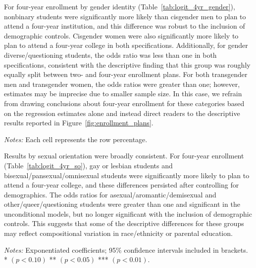 For four-year enrollment by gender identity (Table~\ref{tab:logit_4yr_gender}), nonbinary
students were significantly more likely than cisgender men to plan to
attend a four-year institution, and this difference was robust to the
inclusion of demographic controls. Cisgender women were also
significantly more likely to plan to attend a four-year college in both
specifications. Additionally, for gender diverse/questioning students,
the odds ratio was less than one in both specifications, consistent with
the descriptive finding that this group was roughly equally split
between two- and four-year enrollment plans. For both transgender men
and transgender women, the odds ratios were greater than one; however,
estimates may be imprecise due to smaller sample size. In this case, we
refrain from drawing conclusions about four-year enrollment for these
categories based on the regression estimates alone and instead direct
readers to the descriptive results reported in Figure~\ref{fig:enrollment_plans}.

\begin{table}
\centering
\caption{Intended Field of Study by Gender Identity}
\label{tab:field_of_study}
\footnotesize
\setlength{\tabcolsep}{3pt}

\medskip
\begin{minipage}{\linewidth}
\noindent\footnotesize\textit{Notes:} Each cell represents the row percentage.
\end{minipage}

\end{table}


Results by sexual orientation were broadly consistent. For four-year
enrollment (Table~\ref{tab:logit_4yr_so}), gay or lesbian students and
bisexual/pansexual/omnisexual students were significantly more likely to
plan to attend a four-year college, and these differences persisted
after controlling for demographics. The odds ratios for
asexual/aromantic/demisexual and other/queer/questioning students were
greater than one and significant in the unconditional models, but no
longer significant with the inclusion of demographic controls. This
suggests that some of the descriptive differences for these groups may
reflect compositional variation in race/ethnicity or parental education.

\begin{table}[htbp]
\centering
\caption{Logit Models: Intent to Attend 4-Year College by Gender Identity (Odds Ratios)}
\label{tab:logit_4yr_gender}

\medskip
\begin{minipage}{\linewidth}
\noindent\footnotesize\textit{Notes:} Exponentiated coefficients; 95\% confidence intervals included in
brackets. \\  * $(p<0.10)$ ** $(p<0.05)$ *** $(p<0.01)$.
\end{minipage}
\end{table}


